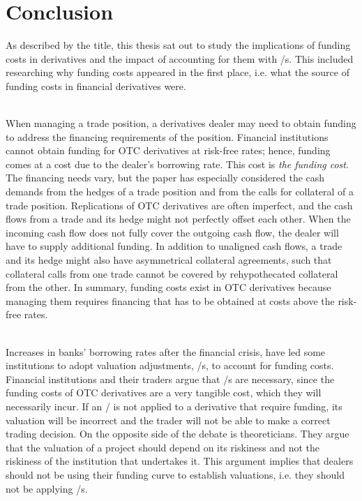 \documentclass[main.tex]{subfiles}
\begin{document}
    \part{Conclusion}

    As described by the title, this thesis sat out to study the implications
    of funding costs in derivatives and the impact of accounting for them with \FVA/s.
    This included researching why funding costs appeared in the first place,
    i.e. what the source of funding costs in financial derivatives were.
    
    \textbf{\researchQuestionFundingCosts}\\
    When managing a trade position, a derivatives dealer may need to obtain funding 
    to address the financing requirements of the position.
    Financial institutions cannot obtain funding for OTC derivatives at risk-free rates;
    hence, funding comes at a cost due to the dealer's borrowing rate.
    This cost is \textit{the funding cost}.
    The financing needs vary, but the paper has especially considered
    the cash demands from the hedges of a trade position
    and from the calls for collateral of a trade position.
    Replications of OTC derivatives are often imperfect,
    and the cash flows from a trade and its hedge might not perfectly offset each other.
    When the incoming cash flow does not fully cover the outgoing cash flow,
    the dealer will have to supply additional funding.
    In addition to unaligned cash flows, 
    a trade and its hedge might also have asymmetrical collateral agreements,
    such that collateral calls from one trade cannot be covered by rehypothecated collateral from the other.
    In summary, funding costs exist in OTC derivatives
    because managing them requires financing 
    that has to be obtained at costs above the risk-free rates.

    \textbf{\researchQuestionFvaDebate}\\
    Increases in banks' borrowing rates after the financial crisis,
    have led some institutions to adopt valuation adjustments, \FVA/s, to account for funding costs.
    Financial institutions and their traders argue that \FVA/s are necessary,
    since the funding costs of OTC derivatives are a very tangible cost,
    which they will necessarily incur.
    If an \FVA/ is not applied to a derivative that require funding,
    its valuation will be incorrect and the trader will not be able to make a correct trading decision.
    On the opposite side of the debate is theoreticians.
    They argue that the valuation of a project should depend on its riskiness
    and not the riskiness of the institution that undertakes it.
    This argument implies that dealers should not be using their funding curve to establish 
    valuations, i.e. they should not be applying \FVA/s.
\end{document}
